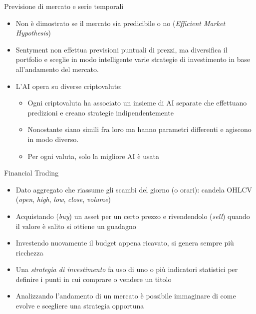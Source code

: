 \documentclass{beamer}
\begin{document}
\begin{frame}{Previsione di mercato e serie temporali}
\begin{itemize}
\item Non è dimostrato se il mercato sia predicibile o no (\textit{Efficient Market Hypothesis})
\item Sentyment non effettua previsioni puntuali di prezzi, ma diversifica il portfolio e sceglie in modo intelligente varie strategie di investimento in base all'andamento del mercato.
\item L'AI opera su diverse criptovalute:
\begin{itemize}
    \item Ogni criptovaluta ha associato un insieme di AI separate che effettuano predizioni e creano strategie indipendentemente
    \item Nonostante siano simili fra loro ma hanno parametri differenti e agiscono in modo diverso.
    \item Per ogni valuta, solo la migliore AI è usata
\end{itemize}
\end{itemize}
\end{frame}

\begin{frame}{Financial Trading}
\begin{itemize}
    \item Dato aggregato che riassume gli scambi del giorno (o orari): candela OHLCV (\textit{open}, \textit{high},     \textit{low}, \textit{close}, \textit{volume})
    \item Acquistando (\textit{buy}) un asset per un certo prezzo e rivendendolo (\textit{sell}) quando il valore è salito si ottiene un guadagno
    \item Investendo nuovamente il budget appena ricavato, si genera sempre più ricchezza
    \item Una \textit{strategia di investimento} fa uso di uno o più indicatori statistici per definire i punti in cui comprare o vendere un titolo
    \item Analizzando l'andamento di un mercato è possibile immaginare di come evolve e scegliere una strategia opportuna
    \begin{figure}
    \end{figure}
\end{itemize}
\end{frame}
\end{document}
